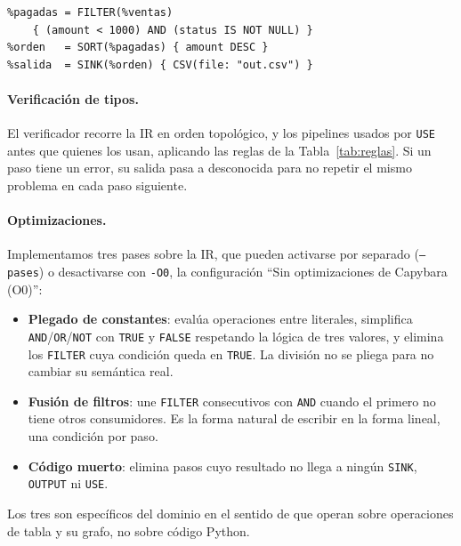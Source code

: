 \documentclass[sigplan,screen,nonacm]{acmart}
\begin{document}
\begin{lstlisting}[language=etl,morekeywords={SOURCE,FILTER,SORT,SINK}]
%ventas  = SOURCE { CSV(file: "orders.csv") : TABLE }
%pagadas = FILTER(%ventas)
    { (amount < 1000) AND (status IS NOT NULL) }
%orden   = SORT(%pagadas) { amount DESC }
%salida  = SINK(%orden) { CSV(file: "out.csv") }
\end{lstlisting}

\paragraph{Verificación de tipos.}
El verificador recorre la IR en orden topológico, y los pipelines usados por \texttt{USE}
antes que quienes los usan, aplicando las reglas de la Tabla~\ref{tab:reglas}. Si un paso
tiene un error, su salida pasa a desconocida para no repetir el mismo problema en cada
paso siguiente.

\paragraph{Optimizaciones.}
Implementamos tres pases sobre la IR, que pueden activarse por separado
(\texttt{--pases}) o desactivarse con \texttt{-O0}, la configuración
``Sin optimizaciones de Capybara (O0)'':
\begin{itemize}
  \item \textbf{Plegado de constantes}: evalúa operaciones entre literales, simplifica
    \texttt{AND}/\texttt{OR}/\texttt{NOT} con \texttt{TRUE} y \texttt{FALSE} respetando la
    lógica de tres valores, y elimina los \texttt{FILTER} cuya condición queda en
    \texttt{TRUE}. La división no se pliega para no cambiar su semántica real.
  \item \textbf{Fusión de filtros}: une \texttt{FILTER} consecutivos con \texttt{AND} cuando
    el primero no tiene otros consumidores. Es la forma natural de escribir en la forma
    lineal, una condición por paso.
  \item \textbf{Código muerto}: elimina pasos cuyo resultado no llega a ningún
    \texttt{SINK}, \texttt{OUTPUT} ni \texttt{USE}.
\end{itemize}
Los tres son específicos del dominio en el sentido de que operan sobre operaciones de tabla
y su grafo, no sobre código Python.
\end{document}
